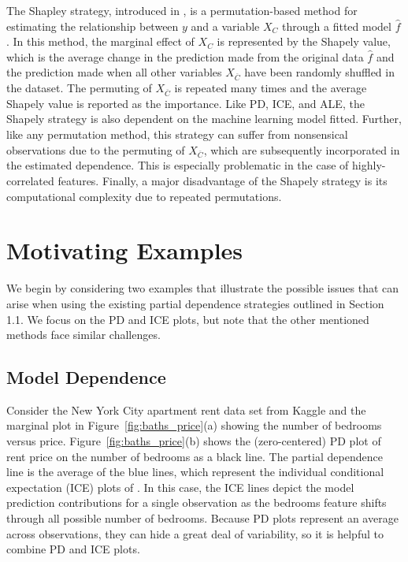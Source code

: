 \documentclass[12pt]{article}
\newcommand{\figref}[1]{Figure~\ref{#1}}
\newcommand{\todo}[1]{{{\color{red}{[#1]}}}}
\begin{document}
The Shapley strategy, introduced in \cite{lundberg2016unexpected}, is a permutation-based method for estimating the relationship between ${y}$ and a variable \todo{variables?} $X_C$ through a fitted model $\widehat{f}$. In this method, the marginal effect of $X_C$ is represented by the Shapely value, which is the average change in the prediction made from the original data $\widehat{f}$ and the prediction made when all other variables $X_{\overline{C}}$ have been randomly shuffled in the dataset. The permuting of $X_{\overline{C}}$ is repeated many times and the average Shapely value is reported as the importance. Like PD, ICE, and ALE, the Shapely strategy is also dependent on the machine learning model fitted. Further, like any permutation method, this strategy can suffer from nonsensical observations due to the permuting of $X_{\overline{C}}$, which are subsequently incorporated in the estimated dependence. This is especially problematic in the case of highly-correlated features. Finally, a major disadvantage of the Shapely strategy is its computational complexity due to repeated permutations. 


\section{Motivating Examples}\label{sec:motivation}
We begin by considering two examples that illustrate the possible issues that can arise when using the existing partial dependence strategies outlined in Section 1.1. We focus on the PD and ICE plots, but note that the other mentioned methods face similar challenges. 


\subsection{Model Dependence}
Consider the New York City apartment rent data set from Kaggle \cite{rent} and the marginal plot in \figref{fig:baths_price}(a) showing the number of bedrooms versus price. \figref{fig:baths_price}(b) shows the (zero-centered) PD plot of rent price on the number of bedrooms as a black line. The partial dependence line is the average of the blue lines, which represent the individual conditional expectation (ICE) plots of \cite{ICE}. In this case, the ICE lines depict the model prediction contributions for a single observation as the bedrooms feature shifts through all possible number of bedrooms. Because PD plots represent an average across observations, they can hide a great deal of variability, so it is helpful to combine PD and ICE plots.
\end{document}
